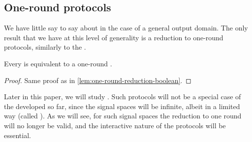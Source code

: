 


\subsection{One-round protocols}

We have little say to say about  in the case of a general output
domain. The  only result that we have at this level of generality is a
reduction to one-round protocols, similarly to the .

\begin{lemma}
\label{lemma:one-round-reduction-general}
  Every  is equivalent to a one-round .
\end{lemma}
\begin{proof}
  Same proof as in \cref{lem:one-round-reduction-boolean}. 
\end{proof}

Later in this paper, we will study .
Such protocols will not be a special case of the  developed so far,
since the signal spaces will be infinite, albeit in a limited way (called
).  As we will see, for such signal spaces the reduction to
one round will no longer be valid, and the interactive nature of the protocols
will be essential.
